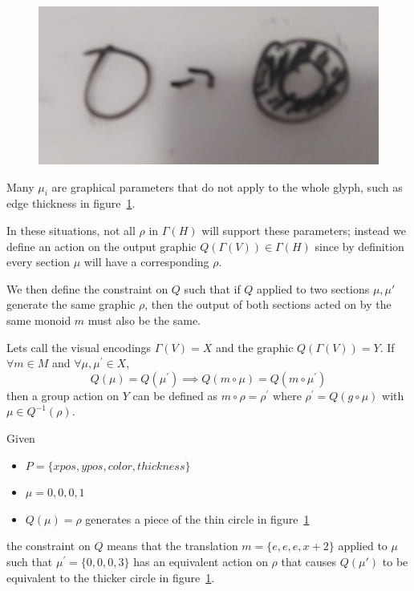 \documentclass[../main.tex]{subfiles}
\begin{document}
\begin{figure}[H]
    \includegraphics[width=\textwidth]{figures/math/diff_type_q.png}
    \label{fig:artist_mark_change}
\end{figure}

Many $\mu_{i}$ are graphical parameters that do not apply to the whole glyph, such as edge thickness in figure~\ref{fig:artist_mark_change}. 

In these situations, not all  $\rho$ in $\Gamma(H)$ will support these parameters; instead we define an action on the output graphic $Q(\Gamma(V)) \in \Gamma(H)$ since by definition every section $\mu$ will have a corresponding $\rho$.

We then define the constraint on $Q$ such that if $Q$ applied to two sections $\mu, \mu\prime$ generate the same graphic $\rho$, then the output of both sections acted on by the same monoid $m$ must also be the same.    

Lets call the visual encodings $\Gamma(V)=X$ and the graphic $Q(\Gamma(V))=Y$. If $\forall m \in M$ and $\forall \mu, \mu^\prime \in X$, 
\begin{equation}
Q(\mu) = Q(\mu^\prime)\implies Q(m\circ\mu) = Q(m\circ\mu^\prime)
\end{equation}
then a group action on $Y$ can be defined as $m\circ \rho = \rho^\prime$ where $\rho^\prime=Q(g\circ \mu)$ with $\mu \in Q^{-1}(\rho)$. 

Given  
\begin{itemize}
    \item $P = \{xpos, ypos, color, thickness\}$
    \item $\mu = {0,0,0, 1}$
    \item  $Q(\mu)=\rho$ generates a piece of the thin circle in figure~\ref{fig:artist_mark_change}
\end{itemize}

the constraint on $Q$ means that the translation $m=\{e, e, e, x+2\}$ applied to $\mu$ such that $\mu^\prime=\{0,0,0,3\}$ has an equivalent action on $\rho$ that causes $Q(\mu\prime)$ to be equivalent to the thicker circle in figure~\ref{fig:artist_mark_change}.
\end{document}
